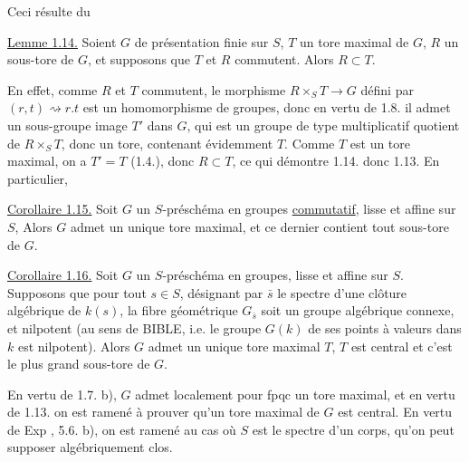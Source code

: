 
Ceci résulte du 

\uline{Lemme 1.14.} Soient $G$  de présentation finie sur $S$, $T$ un tore maximal de $G$,  $R$ un sous-tore de $G$, et supposons que $T$ et $R$ commutent. Alors $R\subset T$.

En effet, comme $R$ et $T$ commutent, le morphisme $R\times_S T\longrightarrow G$ défini  par $(r,t)\rightsquigarrow r.t$ est un homomorphisme de groupes, donc en vertu de 1.8. il admet un sous-groupe image $T'$ dans $G$, qui est un groupe de type multiplicatif quotient de $R\times_S T$, donc un tore, contenant évidemment $T$. Comme $T$ est un tore maximal, on a $T'=T$ (1.4.), donc $R\subset T$,  ce qui démontre 1.14. donc 1.13. En particulier, 

\uline{Corollaire 1.15.} Soit $G$ un $S$-préschéma en groupes  \uline{commutatif}, lisse et affine sur $S$,  Alors $G$ admet un unique tore maximal, et ce  dernier contient tout sous-tore de $G$.

\uline{Corollaire 1.16.} Soit $G$ un $S$-préschéma en groupes, lisse et affine sur $S$. Supposons que pour tout $s\in S$, désignant par $\bar s$ le spectre d'une clôture algébrique  de $k(s)$, la fibre géométrique $G_{\bar s}$ soit un groupe algébrique connexe, et nilpotent (au sens de BIBLE, i.e. le groupe $G(k)$ de ses points à valeurs dans $k$ est nilpotent).  Alors $G$ admet un unique tore maximal $T$,  $T$ est central et c'est le plus grand sous-tore de $G$.

En vertu de 1.7. b), $G$ admet localement pour fpqc un tore maximal, et en vertu de 1.13. on est ramené à prouver qu'un tore maximal de $G$ est central. En vertu de Exp , 5.6. b), on est ramené au cas où $S$ est le spectre d'un corps, qu'on peut supposer algébriquement clos.

